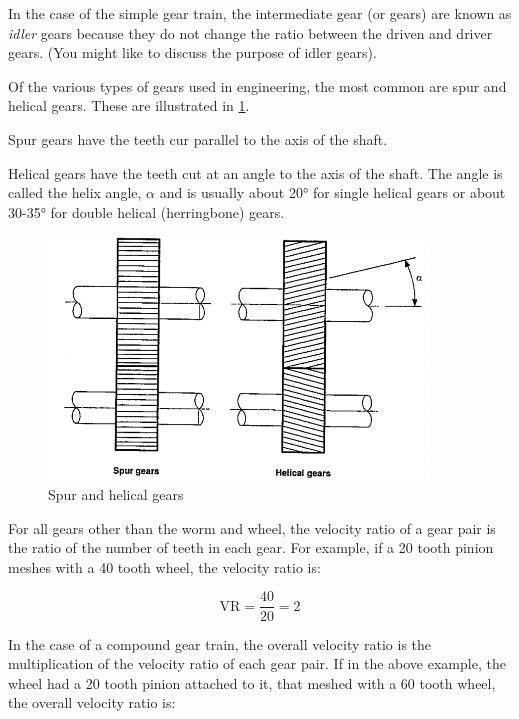 In the case of the simple gear train, the intermediate gear (or gears) are known as \emph{idler} gears because they do not change the ratio between the driven and driver gears. (You might like to discuss the purpose of idler gears).

Of the various types of gears used in engineering, the most common are spur and helical gears. These are illustrated in \cref{fig-2}.

Spur gears have the teeth cur parallel to the axis of the shaft.

Helical gears have the teeth cut at an angle to the axis of the shaft. The angle is called the helix angle, $\alpha$ and is usually about \ang{20} for single helical gears or about 30-\ang{35} for double helical (herringbone) gears.

\begin{figure}[h!]
  \center
  \includegraphics[width=0.9\textwidth]{figs/spur-helical.png}
  \caption{Spur and helical gears}
  \label{fig-2}
\end{figure}

For all gears other than the worm and wheel, the velocity ratio of a gear pair is the ratio of the number of teeth in each gear. For example, if a 20 tooth pinion meshes with a 40 tooth wheel, the velocity ratio is:

\begin{equation}
  \text{VR} = \frac{40}{20} = 2
\end{equation}

In the case of a compound gear train, the overall velocity ratio is the multiplication of the velocity ratio of each gear pair. If in the above example, the wheel had a 20 tooth pinion attached to it, that meshed with a 60 tooth wheel, the overall velocity ratio is:

